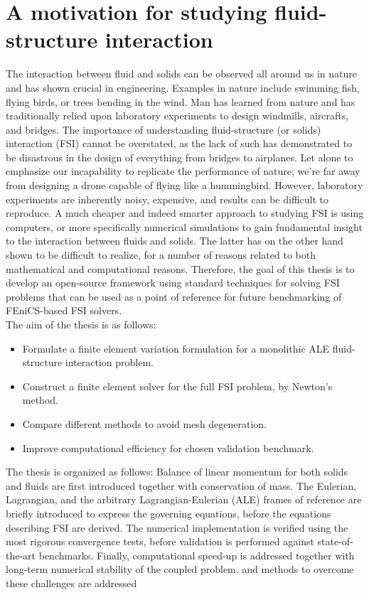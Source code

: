 \chapter{A motivation for studying fluid-structure interaction}
The interaction between fluid and solids can be observed all around us in nature and has shown crucial in engineering. Examples in nature include swimming fish, flying birds, or trees bending in the wind. Man has learned from nature and has traditionally relied upon laboratory experiments to design windmills, aircrafts, and bridges. The importance of understanding fluid-structure (or solids) interaction (FSI) cannot be overstated, as the lack of such has demonstrated to be disastrous in the design of everything from bridges to airplanes. Let alone to emphasize our incapability to replicate the performance of nature; we're far away from designing a drone capable of flying like a hummingbird. However, laboratory experiments are inherently noisy, expensive, and results can be difficult to reproduce. A much cheaper and indeed smarter approach to studying FSI is using computers, or more specifically numerical simulations to gain fundamental insight to the interaction between fluids and solids. The latter has on the other hand shown to be difficult to realize, for a number of reasons related to both mathematical and computational reasons. Therefore, the goal of this thesis is to develop an open-source framework using standard techniques for solving FSI problems that can be used as a point of reference for future benchmarking of FEniCS-based FSI solvers. \\

The aim of the thesis is as follows:

\begin{itemize}
\item Formulate a finite element variation formulation for a monolithic ALE fluid-structure interaction problem.
\item Construct a finite element solver for the full FSI problem, by Newton's method.
\item Compare different methods to avoid mesh degeneration.
\item Improve computational efficiency for chosen validation benchmark.
\end{itemize}

\newpage

 The thesis is organized as follows: Balance of linear momentum for both solids and fluids are first introduced together with conservation of mass. The Eulerian, Lagrangian, and the arbitrary Lagrangian-Eulerian (ALE) frames of reference are briefly introduced to express the governing equations, before the equations describing FSI are derived. The numerical implementation is verified using the most rigorous convergence tests, before validation is performed against state-of-the-art benchmarks. Finally, computational speed-up is addressed together with long-term numerical stability of the coupled problem.
 and methods to overcome these challenges are addressed  
 




